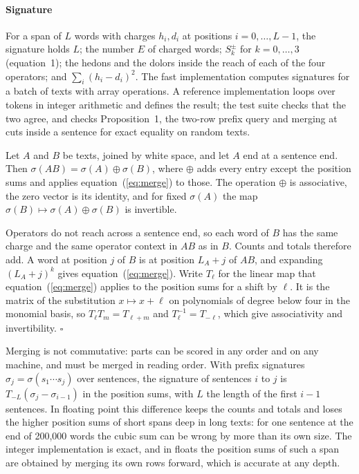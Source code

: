 \paragraph{Signature}
For a span of $L$ words with charges $h_i,d_i$ at positions $i=0,\dots,L-1$, the signature holds $L$; the number $E$ of charged words; $S^{\pm}_k$ for $k=0,\dots,3$ (equation~1); the hedons and the dolors inside the reach of each of the four operators; and $\sum_i (h_i-d_i)^2$. The fast implementation computes signatures for a batch of texts with array operations. A reference implementation loops over tokens in integer arithmetic and defines the result; the test suite checks that the two agree, and checks Proposition~1, the two-row prefix query and merging at cuts inside a sentence for exact equality on random texts.

 Let $A$ and $B$ be texts, joined by white space, and let $A$ end at a sentence end. Then $\sigma(AB)=\sigma(A)\oplus\sigma(B)$, where $\oplus$ adds every entry except the position sums and applies equation~(\ref{eq:merge}) to those. The operation $\oplus$ is associative, the zero vector is its identity, and for fixed $\sigma(A)$ the map $\sigma(B)\mapsto\sigma(A)\oplus\sigma(B)$ is invertible.

\proofhead Operators do not reach across a sentence end, so each word of $B$ has the same charge and the same operator context in $AB$ as in $B$. Counts and totals therefore add. A word at position $j$ of $B$ is at position $L_A+j$ of $AB$, and expanding $(L_A+j)^k$ gives equation~(\ref{eq:merge}). Write $T_\ell$ for the linear map that equation~(\ref{eq:merge}) applies to the position sums for a shift by $\ell$. It is the matrix of the substitution $x\mapsto x+\ell$ on polynomials of degree below four in the monomial basis, so $T_\ell T_m=T_{\ell+m}$ and $T_\ell^{-1}=T_{-\ell}$, which give associativity and invertibility. \hfill$\square$

\smallskip\noindent Merging is not commutative: parts can be scored in any order and on any machine, and must be merged in reading order. With prefix signatures $\sigma_j=\sigma(s_1\cdots s_j)$ over sentences, the signature of sentences $i$ to $j$ is $T_{-L}(\sigma_j-\sigma_{i-1})$ in the position sums, with $L$ the length of the first $i-1$ sentences. In floating point this difference keeps the counts and totals and loses the higher position sums of short spans deep in long texts: for one sentence at the end of 200,000 words the cubic sum can be wrong by more than its own size. The integer implementation is exact, and in floats the position sums of such a span are obtained by merging its own rows forward, which is accurate at any depth.

